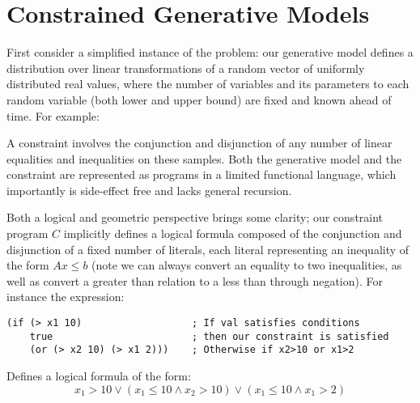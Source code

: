 

\chapter{Constrained Generative Models}


First consider a simplified instance of the problem: our generative model defines a distribution over linear transformations of a random vector of uniformly distributed real values, where the number of variables and its parameters to each random variable (both lower and upper bound) are fixed and known ahead of time.
For example:

A constraint involves the conjunction and disjunction of any number of linear equalities and inequalities on these samples.
Both the generative model and the constraint are represented as programs in a limited functional language, which importantly is side-effect free and lacks general recursion.

Both a logical and geometric perspective brings some clarity; our constraint program $C$ implicitly defines a logical formula composed of the conjunction and disjunction of a fixed number of literals, each literal representing an inequality of the form $Ax \le b$ (note we can always convert an equality to two inequalities, as well as convert a greater than relation to a less than through negation).
For instance the expression:

\begin{verbatim}
(if (> x1 10)                   ; If val satisfies conditions
    true                        ; then our constraint is satisfied
    (or (> x2 10) (> x1 2)))    ; Otherwise if x2>10 or x1>2
\end{verbatim}

Defines a logical formula of the form:
\begin{equation}
x_1 > 10 \lor (x_1 \le 10 \land x_2 > 10) \lor (x_1 \le 10 \land x_1 > 2)
\end{equation}

